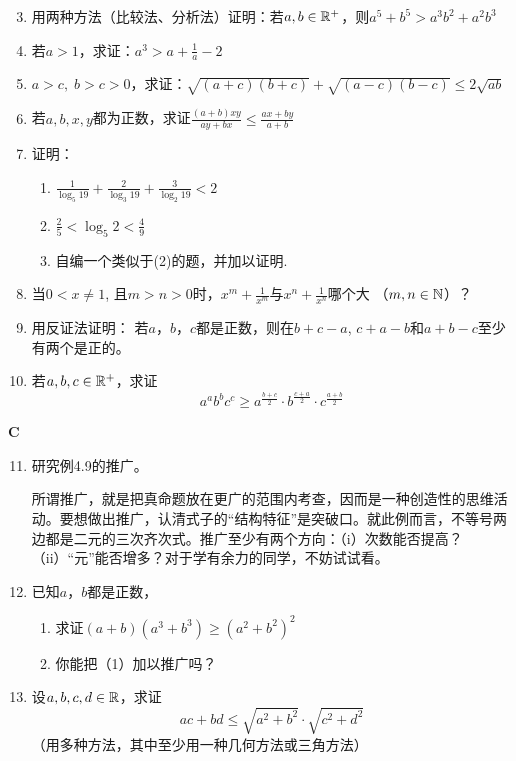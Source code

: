 \begin{enumerate}\setcounter{enumi}{2}
    \item 用两种方法（比较法、分析法）证明：若$a,b\in\mathbb{R}^+$，则$a^5+b^5>a^3b^2+a^2b^3$
    \item 若$a>1$，求证：$a^3>a+\frac{1}{a}-2$
    \item $a>c,\; b>c>0$，求证：$\sqrt{(a+c)(b+c)}+\sqrt{(a-c)(b-c)}\le 2\sqrt{ab}$
    \item 若$a,b,x,y$都为正数，求证$\frac{(a+b)xy}{ay+bx}\le \frac{ax+by}{a+b}$
    \item 证明：
\begin{enumerate}[(1)]
    \item $\frac{1}{\log_5 19}+\frac{2}{\log_3 19}+\frac{3}{\log_2 19}<2$
    \item $\frac{2}{5}<\log_5 2<\frac{4}{9}$
    \item 自编一个类似于(2)的题，并加以证明.
\end{enumerate}

\item 当$0<x\ne 1$, 且$m>n>0$时，$x^m+\frac{1}{x^m}$与$x^n+\frac{1}{x^n}$哪个大
（$m,n\in\mathbb{N}$）？
\item 用反证法证明：
若$a$，$b$，$c$都是正数，则在$b+c-a$, $c+a-b$和$a+b-c$至少有两个是正的。
\item 若$a,b,c\in\mathbb{R}^+$，求证
\[a^a b^b c^c\ge a^{\tfrac{b+c}{2}}\cdot  b^{\tfrac{c+a}{2}}\cdot  c^{\tfrac{a+b}{2}}\]
\end{enumerate}

\begin{center}
    \bfseries C
\end{center}

\begin{enumerate}\setcounter{enumi}{10}
    \item 研究例4.9的推广。
    
    所谓推广，就是把真命题放在更广的范围内考查，因而是一种创造性的思维活动。要想做出推广，认清式子的“结构特征”是突破口。就此例而言，不等号两边都是二元的三次齐次式。推广至少有两个方向：（i）次数能否提高？（ii）“元”能否增多？对于学有余力的同学，不妨试试看。

\item     已知$a$，$b$都是正数，
\begin{enumerate}[(1)]
\item 求证$(a+b)(a^3+b^3)\ge (a^2+b^2)^2$
\item 你能把（1）加以推广吗？
\end{enumerate}

\item    设$a,b,c,d\in\mathbb{R}$，求证
    \[ac+bd\le \sqrt{a^2+b^2}\cdot \sqrt{c^2+d^2}\]
    （用多种方法，其中至少用一种几何方法或三角方法）
\end{enumerate}


